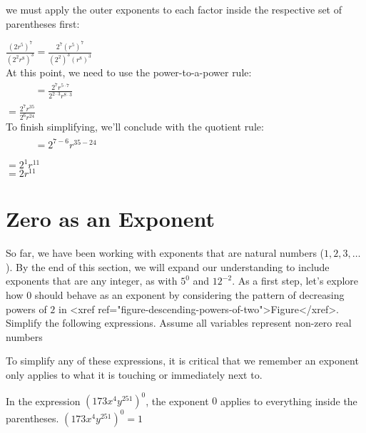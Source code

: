 \documentclass{ximera}
\begin{document}
\begin{example}
\begin{explanation}
\begin{enumerate}
                  we must apply the outer exponents to each factor inside the respective set of parentheses first:
              \begin{center}
                    $\frac{\left(2r^5\right)^7}{\left(2^2 r^8\right)^3}
                    =  \frac{2^7 \left(r^5\right)^7}{\left(2^2\right)^3 \left(r^8\right)^3}$\\
                   At this point, we need to use the power-to-a-power rule:\\
                    $\phantom{\frac{\left(2r^5\right)^7}{\left(2^2 r^8\right)^3}}
                    = \frac{2^{7} r^{5\cdot 7}}{ 2^{2\cdot 3} r^{8 \cdot 3}}$\\
                    $= \frac{2^{7} r^{35}}{ 2^{6} r^{24}}$\\
                   To finish simplifying, we'll conclude with the quotient rule:\\
                    $\phantom{\frac{\left(2r^5\right)^7}{\left(2^2 r^8\right)^3}}
                    = 2^{7-6} r^{35-24}$\\
                    $= 2^{1} r^{11}$\\
                    $= 2 r^{11}$
\end{center}
\end{enumerate}
\end{explanation}
\end{example}
\section{Zero as an Exponent}
So far, we have been working with exponents that are natural numbers
      ($1, 2, 3, \ldots$).
      By the end of this section,
      we will expand our understanding to include exponents that are any integer,
      as with $5^{0}$ and $12^{-2}$.
      As a first step,
      let's explore how $0$ should behave as an exponent
      by considering the pattern of decreasing powers of $2$ in <xref ref="figure-descending-powers-of-two">Figure</xref>.    
 Simplify the following expressions.
              Assume all variables represent non-zero real numbers


To simplify any of these expressions,
              it is critical that we remember an exponent only applies to what it is touching or immediately next to.


     In the expression $\left(173 x^4 y^{251}\right)^0$,
                    the exponent $0$ applies to everything inside the parentheses.
$
                      \left(173 x^4 y^{251}\right)^0 =  1
                    $
\end{document}
